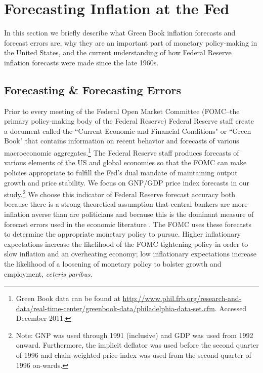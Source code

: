 \documentclass[a4paper]{article}\usepackage{graphicx, color}
\begin{document}

\section{Forecasting Inflation at the Fed}

In this section we briefly describe what Green Book inflation forecasts and forecast errors are, why they are an important part of monetary policy-making in the United States, and the current understanding of how Federal Reserve inflation forecasts were made since the late 1960s.

\subsection{Forecasting \& Forecasting Errors}

Prior to every meeting of the Federal Open Market Committee (FOMC--the primary policy-making body of the Federal Reserve) Federal Reserve staff create a document called the ``Current Economic and Financial Conditions" or ``Green Book" that contains information on recent behavior and forecasts of various macroeconomic aggregates.\footnote{Green Book data can be found at {\url{http://www.phil.frb.org/research-and-data/real-time-center/greenbook-data/philadelphia-data-set.cfm}}. Accessed December 2011.} The Federal Reserve staff produces forecasts of various elements of the US and global economies so that the FOMC can make policies appropriate to fulfill the Fed's dual mandate of maintaining output growth and price stability. We focus on GNP/GDP price index forecasts in our study.\footnote{Note: GNP was used through 1991 (inclusive) and GDP was used from 1992 onward. Furthermore, the implicit deflator was used before the second quarter of 1996 and chain-weighted price index was used from the second quarter of 1996 on-wards.} We choose this indicator of Federal Reserve forecast accuracy both because there is a strong theoretical assumption that central bankers are more inflation averse than are politicians \citep{Cukierman1992,Mukherjee2008,Tillmann2008} and because this is the dominant measure of forecast errors used in the economic literature \citep[c.f.][]{Romer2000}. The FOMC uses these forecasts to determine the appropriate monetary policy to pursue. Higher inflationary expectations increase the likelihood of the FOMC tightening policy in order to slow inflation and an overheating economy; low inflationary expectations increase the likelihood of a loosening of monetary policy to bolster growth and employment, \emph{ceteris paribus}.
\end{document}
